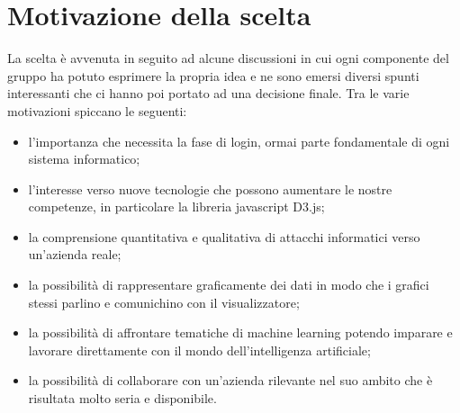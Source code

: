\section{Motivazione della scelta}

La scelta è avvenuta in seguito ad alcune discussioni in cui ogni componente del gruppo ha potuto esprimere la propria idea e ne sono emersi diversi spunti interessanti che ci hanno poi portato ad una decisione finale. Tra le varie motivazioni spiccano le seguenti:
\begin{itemize}
    \item l’importanza che necessita la fase di login, ormai parte fondamentale di ogni sistema informatico;
    \item l’interesse verso nuove tecnologie che possono aumentare le nostre competenze, in particolare la libreria javascript D3.js;
    \item la comprensione quantitativa e qualitativa di attacchi informatici verso un'azienda reale;
    \item la possibilità di rappresentare graficamente dei dati in modo che i grafici stessi parlino e comunichino con il visualizzatore;
    \item la possibilità di affrontare tematiche di machine learning potendo imparare e lavorare direttamente con il mondo dell’intelligenza artificiale;
    \item la possibilità di collaborare con un’azienda rilevante nel suo ambito che è risultata molto seria e disponibile.
\end{itemize}
